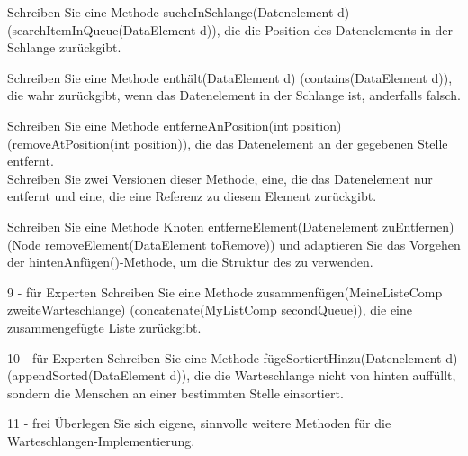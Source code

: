 \documentclass{article}
\begin{document}
\begin{task}{5}
    Schreiben Sie eine Methode sucheInSchlange(Datenelement d) (searchItemInQueue(DataElement d)), die die Position des Datenelements in der Schlange zurückgibt. \\
\end{task}
    
\begin{task}{6}
    Schreiben Sie eine Methode enthält(DataElement d) (contains(DataElement d)), die wahr zurückgibt, wenn das Datenelement in der Schlange ist, anderfalls falsch.
\end{task}
\begin{task}{7}
    Schreiben Sie eine Methode entferneAnPosition(int position) (removeAtPosition(int position)), die das Datenelement an der gegebenen Stelle entfernt.\\
    Schreiben Sie zwei Versionen dieser Methode, eine, die das Datenelement nur entfernt und eine, die eine Referenz zu diesem Element zurückgibt.
\end{task}

\begin{task}{8}
Schreiben Sie eine Methode Knoten entferneElement(Datenelement zuEntfernen) (Node removeElement(DataElement toRemove)) und adaptieren Sie das Vorgehen der hintenAnfügen()-Methode, um die Struktur des  zu verwenden.
\end{task}

\begin{task}{9 - für Experten}
    Schreiben Sie eine Methode zusammenfügen(MeineListeComp zweiteWarteschlange) (concatenate(MyListComp secondQueue)), die eine zusammengefügte Liste zurückgibt. 
\end{task}
    
\begin{task}{10 - für Experten}
    Schreiben Sie eine Methode fügeSortiertHinzu(Datenelement d) (appendSorted(DataElement d)), die die Warteschlange nicht von hinten auffüllt, sondern die Menschen an einer bestimmten Stelle einsortiert. \\
    \end{task}
    
\begin{task}{11 - frei}
    Überlegen Sie sich eigene, sinnvolle weitere Methoden für die Warteschlangen-Implementierung.
\end{task}
\end{document}
